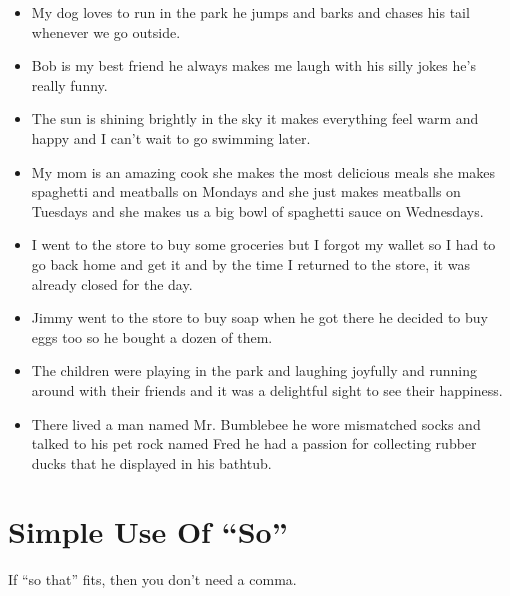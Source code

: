 \documentclass[letterpaper, 17pt]{article}
\begin{document}
\begin{itemize}
	\item My dog loves to run in the park he jumps and barks and chases his tail whenever we go outside.	%
	
	\item Bob is my best friend he always makes me laugh with his silly jokes he's really funny.	%

	\item The sun is shining brightly in the sky it makes everything feel warm and happy and I can't wait to go swimming later.	%

	\item My mom is an amazing cook she makes the most delicious meals she makes spaghetti and meatballs on Mondays and she just makes meatballs on Tuesdays and she makes us a big bowl of spaghetti sauce on Wednesdays.	%

	\item I went to the store to buy some groceries but I forgot my wallet so I had to go back home and get it and by the time I returned to the store, it was already closed for the day.	%

	\item Jimmy went to the store to buy soap when he got there he decided to buy eggs too so he bought a dozen of them.	%

	\item The children were playing in the park and laughing joyfully and running around with their friends and it was a delightful sight to see their happiness.	%

	\item There lived a man named Mr. Bumblebee he wore mismatched socks and talked to his pet rock named Fred he had a passion for collecting rubber ducks that he displayed in his bathtub.	%
\end{itemize}

\newpage
\section*{Simple Use Of ``So''}

If ``so that'' fits, then you don't need a comma.
\end{document}
